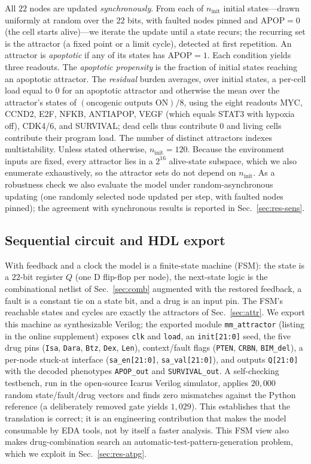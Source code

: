 \documentclass[conference,letterpaper]{IEEEtran}
\begin{document}
All $22$ nodes are updated \emph{synchronously}. From each of $n_{\text{init}}$
initial states---drawn uniformly at random over the $22$ bits, with faulted
nodes pinned and $\text{APOP}=0$ (the cell starts alive)---we iterate the update
until a state recurs; the recurring set is the attractor (a fixed point or a
limit cycle), detected at first repetition. An attractor is \emph{apoptotic} if
any of its states has $\text{APOP}=1$. Each condition yields three readouts. The
\emph{apoptotic propensity} is the fraction of initial states reaching an
apoptotic attractor. The \emph{residual} burden averages, over initial states, a
per-cell load equal to $0$ for an apoptotic attractor and otherwise the mean over
the attractor's states of $(\text{oncogenic outputs ON})/8$, using the eight
readouts MYC, CCND2, E2F, NFKB, ANTIAPOP, VEGF (which equals STAT3 with hypoxia
off), CDK4/6, and SURVIVAL; dead cells thus contribute $0$ and living cells
contribute their program load. The number of distinct attractors indexes
multistability. Unless stated otherwise, $n_{\text{init}}=120$. Because the
environment inputs are fixed, every attractor lies in a $2^{16}$ alive-state
subspace, which we also enumerate exhaustively, so the attractor sets do not
depend on $n_{\text{init}}$.
As a robustness check we also evaluate the model under random-asynchronous
updating (one randomly selected node updated per step, with faulted nodes
pinned); the agreement with synchronous results is reported in
Sec.~\ref{sec:res-sens}.

\subsection{Sequential circuit and HDL export}\label{sec:hdl}
With feedback and a clock the model is a finite-state machine (FSM): the state is
a $22$-bit register $Q$ (one D flip-flop per node), the next-state logic is the
combinational netlist of Sec.~\ref{sec:comb} augmented with the restored feedback,
a fault is a constant tie on a state bit, and a drug
is an input pin. The FSM's reachable states and cycles are exactly the attractors
of Sec.~\ref{sec:attr}. We export this machine as synthesizable Verilog;
the exported module \texttt{mm\_attractor} (listing in the online supplement) exposes
\texttt{clk} and \texttt{load}, an \texttt{init[21:0]} seed, the five drug pins
(\texttt{Isa}, \texttt{Dara}, \texttt{Btz}, \texttt{Dex}, \texttt{Len}),
context/fault flags (\texttt{PTEN}, \texttt{CRBN}, \texttt{BIM\_del}), a per-node
stuck-at interface (\texttt{sa\_en[21:0]}, \texttt{sa\_val[21:0]}), and outputs
\texttt{Q[21:0]} with the decoded phenotypes \texttt{APOP\_out} and
\texttt{SURVIVAL\_out}. A self-checking testbench, run in the open-source
Icarus Verilog simulator, applies $20{,}000$ random state/fault/drug vectors and
finds zero mismatches against the Python reference (a deliberately removed gate
yields $1{,}029$). This establishes that the translation is correct; it is an
engineering contribution that makes the model consumable by EDA tools, not by
itself a faster analysis. This FSM view
also makes drug-combination search an automatic-test-pattern-generation problem,
which we exploit in Sec.~\ref{sec:res-atpg}.
\end{document}
